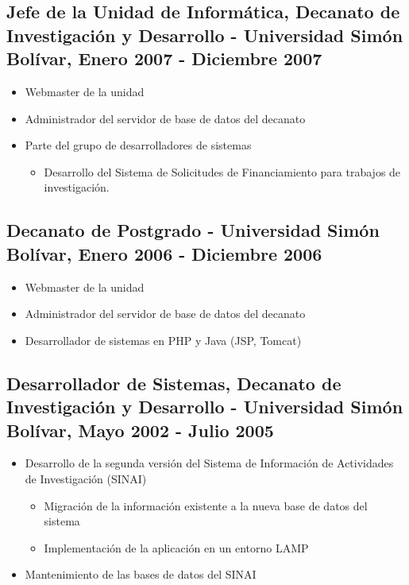 \documentclass[letterpaper,11pt]{report}
\begin{document}
\subsection*{Jefe de la Unidad de Informática, Decanato de Investigación y Desarrollo - Universidad Simón Bolívar, Enero 2007 - Diciembre 2007}
\begin{itemize}
\item Webmaster de la unidad
\item Administrador del servidor de base de datos del decanato
\item Parte del grupo de desarrolladores de sistemas
\begin{itemize}
	\item Desarrollo del Sistema de Solicitudes de Financiamiento para trabajos de investigación.
\end{itemize}
\end{itemize}

\subsection*{Decanato de Postgrado - Universidad Simón Bolívar, Enero 2006 - Diciembre 2006}
\begin{itemize}
\item Webmaster de la unidad
\item Administrador del servidor de base de datos del decanato
\item Desarrollador de sistemas en PHP y Java (JSP, Tomcat)
\end{itemize}

\subsection*{Desarrollador de Sistemas, Decanato de Investigación y Desarrollo - Universidad Simón Bolívar, Mayo 2002 - Julio 2005}
\begin{itemize}
\item Desarrollo de la segunda versión del Sistema de Información de Actividades de Investigación (SINAI)
\begin{itemize}
	\item Migración de la información existente a la nueva base de datos del sistema
	\item Implementación de la aplicación en un entorno LAMP
\end{itemize}
\item Mantenimiento de las bases de datos del SINAI
\end{itemize}
\end{document}
